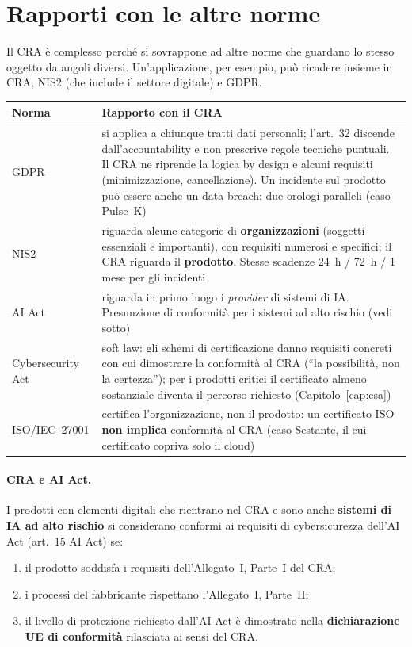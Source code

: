 \section{Rapporti con le altre norme}
\label{sec:cra-rapporti}

Il CRA è complesso perché si sovrappone ad altre norme che guardano lo stesso oggetto da angoli diversi.
Un'applicazione, per esempio, può ricadere insieme in CRA, NIS2 (che include il settore digitale) e
GDPR.

\begin{center}
\small
\begin{tabularx}{\linewidth}{>{\raggedright\arraybackslash}p{2.4cm} X}
\toprule
\textbf{Norma} & \textbf{Rapporto con il CRA}\\
\midrule
GDPR & si applica a chiunque tratti dati personali; l'art.~32 discende dall'accountability e non prescrive
  regole tecniche puntuali. Il CRA ne riprende la logica by design e alcuni requisiti (minimizzazione,
  cancellazione). Un incidente sul prodotto può essere anche un data breach: due orologi paralleli (caso
  Pulse~K)\\
NIS2 & riguarda alcune categorie di \textbf{organizzazioni} (soggetti essenziali e importanti), con
  requisiti numerosi e specifici; il CRA riguarda il \textbf{prodotto}. Stesse scadenze 24~h / 72~h / 1
  mese per gli incidenti\\
AI Act & riguarda in primo luogo i \emph{provider} di sistemi di IA. Presunzione di conformità per i
  sistemi ad alto rischio (vedi sotto)\\
Cybersecurity Act & soft law: gli schemi di certificazione danno requisiti concreti con cui dimostrare la
  conformità al CRA (``la possibilità, non la certezza''); per i prodotti critici il certificato almeno
  sostanziale diventa il percorso richiesto (Capitolo~\ref{cap:csa})\\
ISO/IEC~27001 & certifica l'organizzazione, non il prodotto: un certificato ISO \textbf{non implica}
  conformità al CRA (caso Sestante, il cui certificato copriva solo il cloud)\\
\bottomrule
\end{tabularx}
\end{center}

\paragraph{CRA e AI Act.} I prodotti con elementi digitali che rientrano nel CRA e sono anche
\textbf{sistemi di IA ad alto rischio} si considerano conformi ai requisiti di cybersicurezza dell'AI
Act (art.~15 AI Act) se:
\begin{enumerate}
  \item il prodotto soddisfa i requisiti dell'Allegato~I, Parte~I del CRA;
  \item i processi del fabbricante rispettano l'Allegato~I, Parte~II;
  \item il livello di protezione richiesto dall'AI Act è dimostrato nella \textbf{dichiarazione UE di
    conformità} rilasciata ai sensi del CRA.
\end{enumerate}

